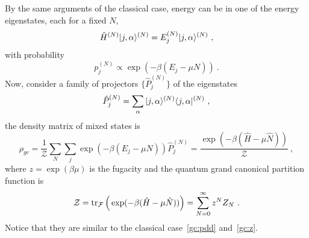     By the same arguments of the classical case, energy can be in one of the energy eigenstates, each for a fixed $N$,
    \begin{equation*}
        \hat H^{(N)} \vert j, \alpha\rangle^{(N)} = E_j^{(N)} \vert j, \alpha\rangle^{(N)} ~,
    \end{equation*}
    with probability 
    \begin{equation}\label{prob2}
        p_j^{(N)} \propto \exp(- \beta (E_j - \mu N)) ~.
    \end{equation}
    Now, consider a family of projectors $\{\hat P_j^{(N)}\}$ of the eigenstates
    \begin{equation*}
        \hat P_j^{(N)} = \sum_\alpha \vert j, \alpha\rangle^{(N)} \langle j, \alpha\vert^{(N)} ~,
    \end{equation*}  
    the density matrix of mixed states is 
    \begin{equation*}
        \rho_{gc} = \frac{1}{\mathcal Z} \sum_N \sum_j \exp(- \beta (E_j - \mu N)) \hat P_j^{(N)} = \frac{\exp(- \beta (\hat H - \mu \hat N))}{\mathcal Z} ~,
    \end{equation*}
    where $z = \exp(\beta \mu)$ is the fugacity and the quantum grand canonical partition function is 
    \begin{equation}\label{qgc:z}
        \mathcal Z = \operatorname{tr}_{\mathcal F} \Big ( \exp(- \beta (\hat H - \mu \hat N)) \Big) = \sum_{N=0}^\infty z^N Z_N ~.
    \end{equation}
    Notice that they are similar to the classical case~\eqref{gc:pdd} and~\eqref{gc:z}.
